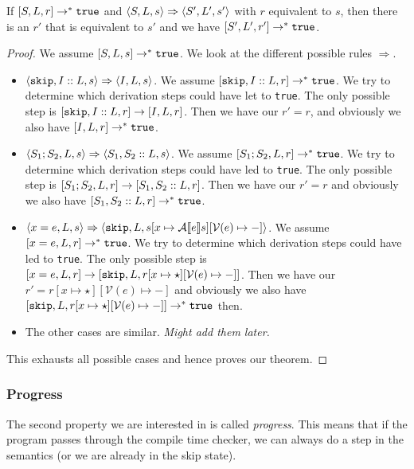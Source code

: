 \begin{theorem}
\label{preservation}
If $[ S, L, r ] \to ^* \texttt{true}$ and $\langle S, L, s \rangle \Rightarrow \langle S', L', s' \rangle$ with $r$ equivalent to $s$, then there is an $r'$ that is equivalent to $s'$ and we have $[ S', L', r' ] \to ^* \texttt{true}$.
\end{theorem}

\begin{proof}
We assume $[ S, L, s ] \to ^* \texttt{true}$. We look at the different possible rules $\Rightarrow$. 
\begin{itemize}
    \item $\langle \texttt{skip}, I::L, s \rangle \Rightarrow \langle I, L, s \rangle$. We assume $[ \texttt{skip}, I::L, r ] \to ^* \texttt{true}$. We try to determine which derivation steps could have let to \texttt{true}. The only possible step is $[ \texttt{skip}, I::L, r ]\to [ I, L, r ]$. Then we have our $r' = r$, and obviously we also have $[ I, L, r ] \to^* \texttt{true}$.
    \item $\langle S_1; S_2, L, s \rangle \Rightarrow \langle S_1, S_2::L, s \rangle$. We assume $[ S_1; S_2, L, r ] \to ^* \texttt{true}$. We try to determine which derivation steps could have led to \texttt{true}. The only possible step is $[ S_1; S_2, L, r ] \to [ S_1, S_2::L, r ]$. Then we have our $r' = r$ and obviously we also have $[ S_1, S_2::L, r ] \to^* \texttt{true}$.
    \item $\langle x = e, L, s \rangle \Rightarrow \langle \texttt{skip}, L, s[x \mapsto \mathcal{A} \llbracket e \rrbracket s][\mathcal{V}(e)\mapsto-] \rangle$. We assume $[ x = e, L, r ] \to ^* \texttt{true}$. We try to determine which derivation steps could have led to \texttt{true}. The only possible step is $[ x=e, L, r ] \to [ \texttt{skip}, L, r[x\mapsto \star][\mathcal{V}(e) \mapsto -] ]$. Then we have our $r' = r[x\mapsto \star][\mathcal{V}(e) \mapsto -]$ and obviously we also have $[ \texttt{skip}, L, r[x\mapsto \star][\mathcal{V}(e) \mapsto -] ] \to^* \texttt{true}$ then.
    \item The other cases are similar. \emph{Might add them later.}
\end{itemize}
This exhausts all possible cases and hence proves our theorem.
\end{proof}

\subsubsection{Progress}
The second property we are interested in is called \emph{progress}. This means that if the program passes through the compile time checker, we can always do a step in the semantics (or we are already in the skip state). 

